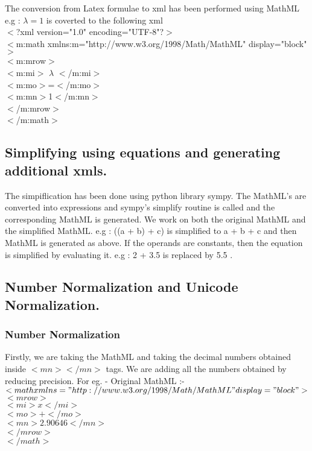 \documentclass[
journal=jacsat, %
manuscript=article]{achemso}
\begin{document}
	The conversion from Latex formulae to xml has been performed using MathML\\
	e.g : $\lambda = 1$ is coverted to the following xml\\ 
	$<$?xml version="1.0" encoding="UTF-8"?$>$\\
	$<$m:math xmlns:m="http://www.w3.org/1998/Math/MathML" display="block"$>$\\
	  $<$m:mrow$>$\\
	    $<$m:mi$>$ $\lambda$ $<$/m:mi$>$\\
	    $<$m:mo$>$=$<$/m:mo$>$\\
	    $<$m:mn$>$1$<$/m:mn$>$\\
	  $<$/m:mrow$>$\\
	$<$/m:math$>$
	
	\subsection{Simplifying using equations and generating additional xmls.}
	
	The simpiflication has been done using python library sympy. The MathML's are converted into expressions and
	sympy's simplify routine is called and the corresponding MathML is generated. We work on both the original MathML
	and the simplified MathML.
	e.g : ((a + b) + c) is simplified to a + b + c and then MathML is generated as above.
	If the operands are constants, then the equation is simplified by evaluating it. e.g : 2 + 3.5 is replaced by 5.5 .
	
	\subsection{Number Normalization and Unicode Normalization.}
	
	  \subsubsection{Number Normalization}
	   Firstly, we are taking the MathML and taking the decimal numbers obtained inside $<mn> </mn>$ tags. We are
	   adding all the numbers obtained by reducing precision. For eg. - Original MathML :- \\
	   $<math xmlns="http://www.w3.org/1998/Math/MathML" display="block">$\\
	   $<mrow>$\\
	   $<mi>x</mi>$\\
	   $<mo> + </mo>$\\
	   $<mn>2.90646</mn>$\\
	   $</mrow>$\\
	   $</math>$\\
	   
\end{document}
